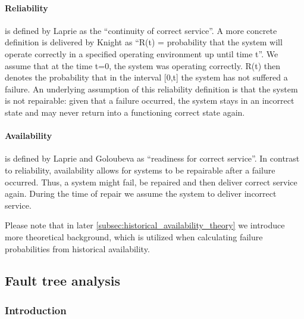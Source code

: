 \paragraph{Reliability} is defined by Laprie \cite{Laprie2004} as the ``continuity of correct service''. A more concrete definition is delivered by Knight \cite{FundamentalsDepComputing} as ``R(t) = probability that the system will operate correctly in a specified operating environment up until time t''. We assume that at the time t=0, the system was operating correctly. R(t) then denotes the probability that in the interval [0,t] the system has not suffered a failure. An underlying assumption of this reliability definition is that the system is not repairable: given that a failure occurred, the system stays in an incorrect state and may never return into a functioning correct state again.


\paragraph{Availability} is defined by Laprie \cite{Laprie2004} and Goloubeva \cite{Goloubeva2006} as ``readiness for correct service''. In contrast to reliability, availability allows for systems to be repairable after a failure occurred. Thus, a system might fail, be repaired and then deliver correct service again. During the time of repair we assume the system to deliver incorrect service.

Please note that in later \autoref{subsec:historical_availability_theory} we introduce more theoretical background, which is utilized when calculating failure probabilities from historical availability.

\subsection{Fault tree analysis}
\label{subsec:theory_faulttree}

\subsubsection{Introduction}

